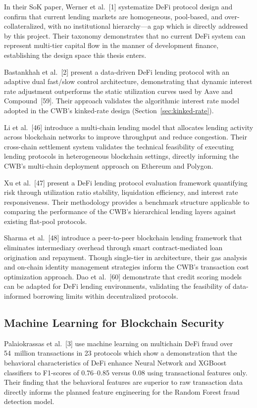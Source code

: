 \documentclass[12pt,a4paper]{report}
\begin{document}
In their SoK paper, Werner et al.~[1] systematize DeFi protocol design and confirm that current lending markets are homogeneous, pool-based, and over-collateralized, with no institutional hierarchy---a gap which is directly addressed by this project. Their taxonomy demonstrates that no current DeFi system can represent multi-tier capital flow in the manner of development finance, establishing the design space this thesis enters.

Bastankhah et al.~[2] present a data-driven DeFi lending protocol with an adaptive dual fast/slow control architecture, demonstrating that dynamic interest rate adjustment outperforms the static utilization curves used by Aave and Compound~[59]. Their approach validates the algorithmic interest rate model adopted in the CWB's kinked-rate design (Section~\ref{sec:kinked-rate}).

Li et al.~[46] introduce a multi-chain lending model that allocates lending activity across blockchain networks to improve throughput and reduce congestion. Their cross-chain settlement system validates the technical feasibility of executing lending protocols in heterogeneous blockchain settings, directly informing the CWB's multi-chain deployment approach on Ethereum and Polygon.

Xu et al.~[47] present a DeFi lending protocol evaluation framework quantifying risk through utilization ratio stability, liquidation efficiency, and interest rate responsiveness. Their methodology provides a benchmark structure applicable to comparing the performance of the CWB's hierarchical lending layers against existing flat-pool protocols.

Sharma et al.~[48] introduce a peer-to-peer blockchain lending framework that eliminates intermediary overhead through smart contract-mediated loan origination and repayment. Though single-tier in architecture, their gas analysis and on-chain identity management strategies inform the CWB's transaction cost optimization approach. Dao et al.~[60] demonstrate that credit scoring models can be adapted for DeFi lending environments, validating the feasibility of data-informed borrowing limits within decentralized protocols.

\subsection{Machine Learning for Blockchain Security}

Palaiokrassas et al.~[3] use machine learning on multichain DeFi fraud over 54~million transactions in 23 protocols which show a demonstration that the behavioral characteristics of DeFi enhance Neural Network and XGBoost classifiers to F1-scores of 0.76--0.85 versus 0.08 using transactional features only. Their finding that the behavioral features are superior to raw transaction data directly informs the planned feature engineering for the Random Forest fraud detection model.
\end{document}
